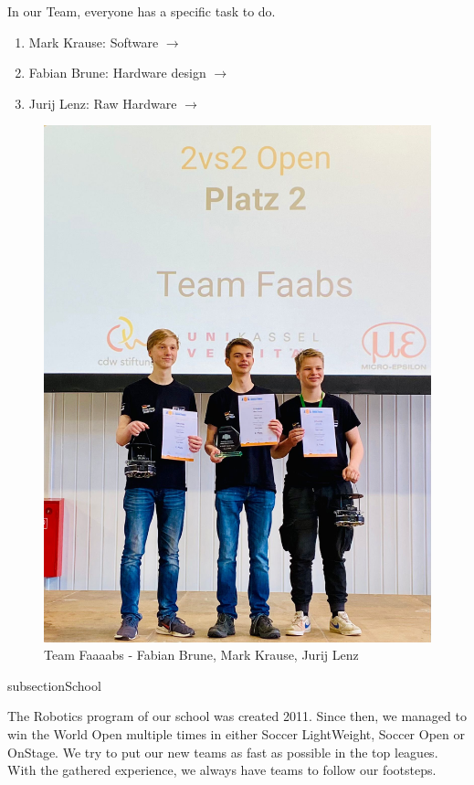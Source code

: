 \documentclass{scrartcl}
\begin{document}
    
    In our Team, everyone has a specific task to do.
\begin{enumerate}
    \item{Mark Krause: Software $\rightarrow$ }
    \item{Fabian Brune: Hardware design $\rightarrow$ }
    \item{Jurij Lenz: Raw Hardware $\rightarrow$ }
\end{enumerate}
\begin{figure}[h]
    \centering
    \includegraphics[width=\textwidth]{img/Siegerehrung Kassel 1.png}
    \caption{Team Faaaabs - Fabian Brune, Mark Krause, Jurij Lenz}
    \label{fig:team}
\end{figure}

\newpage

subsection{School}


The Robotics program of our school was created 2011. Since then, we managed to win the World Open
multiple times in either Soccer LightWeight, Soccer Open or OnStage.
We try to put our new teams as fast as possible in the top leagues. With the gathered experience, we always
have teams to follow our footsteps.
\newline
\end{document}
